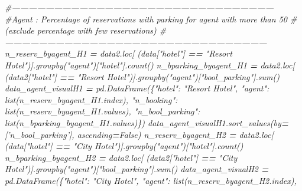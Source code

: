 \documentclass[10pt,a4paper]{article}
\newenvironment{Shaded}{\begin{snugshade}}{\end{snugshade}}
\newcommand{\BuiltInTok}[1]{#1}
\newcommand{\CommentTok}[1]{\textcolor[rgb]{0.56,0.35,0.01}{\textit{#1}}}
\newcommand{\NormalTok}[1]{#1}
\newcommand{\OperatorTok}[1]{\textcolor[rgb]{0.81,0.36,0.00}{\textbf{#1}}}
\newcommand{\StringTok}[1]{\textcolor[rgb]{0.31,0.60,0.02}{#1}}
\newcommand{\VariableTok}[1]{\textcolor[rgb]{0.00,0.00,0.00}{#1}}
\theoremstyle{break}
\begin{document}
\begin{Shaded}
\begin{Highlighting}[]
\CommentTok{#---------------------------------------------------------------------------------------------}
\CommentTok{#Agent : Percentage of reservations with parking for agent with more than 50%
\CommentTok{#        (exclude percentage with few reservations)}
\CommentTok{#---------------------------------------------------------------------------------------------}
\NormalTok{n_reserv_byagent_H1 }\OperatorTok{=}\NormalTok{ data2.loc[}
\NormalTok{    (data[}\StringTok{"hotel"}\NormalTok{] }\OperatorTok{==} \StringTok{"Resort Hotel"}\NormalTok{)].groupby(}\StringTok{"agent"}\NormalTok{)[}\StringTok{"hotel"}\NormalTok{].count()}
\NormalTok{n_bparking_byagent_H1 }\OperatorTok{=}\NormalTok{ data2.loc[}
\NormalTok{    (data2[}\StringTok{"hotel"}\NormalTok{] }\OperatorTok{==} \StringTok{"Resort Hotel"}\NormalTok{)].groupby(}\StringTok{"agent"}\NormalTok{)[}\StringTok{"bool_parking"}\NormalTok{].}\BuiltInTok{sum}\NormalTok{()}
\NormalTok{data_agent_visualH1 }\OperatorTok{=}\NormalTok{ pd.DataFrame(\{}\StringTok{"hotel"}\NormalTok{: }\StringTok{"Resort Hotel"}\NormalTok{,}
                                \StringTok{"agent"}\NormalTok{: }\BuiltInTok{list}\NormalTok{(n_reserv_byagent_H1.index),}
                                \StringTok{"n_booking"}\NormalTok{: }\BuiltInTok{list}\NormalTok{(n_reserv_byagent_H1.values),}
                                \StringTok{"n_bool_parking"}\NormalTok{: }\BuiltInTok{list}\NormalTok{(n_bparking_byagent_H1.values)\})}
\NormalTok{data_agent_visualH1.sort_values(by}\OperatorTok{=}\NormalTok{[}\StringTok{'n_bool_parking'}\NormalTok{], ascending}\OperatorTok{=}\VariableTok{False}\NormalTok{)}
\NormalTok{n_reserv_byagent_H2 }\OperatorTok{=}\NormalTok{ data2.loc[}
\NormalTok{    (data[}\StringTok{"hotel"}\NormalTok{] }\OperatorTok{==} \StringTok{"City Hotel"}\NormalTok{)].groupby(}\StringTok{"agent"}\NormalTok{)[}\StringTok{"hotel"}\NormalTok{].count()}
\NormalTok{n_bparking_byagent_H2 }\OperatorTok{=}\NormalTok{ data2.loc[}
\NormalTok{    (data2[}\StringTok{"hotel"}\NormalTok{] }\OperatorTok{==} \StringTok{"City Hotel"}\NormalTok{)].groupby(}\StringTok{"agent"}\NormalTok{)[}\StringTok{"bool_parking"}\NormalTok{].}\BuiltInTok{sum}\NormalTok{()}
\NormalTok{data_agent_visualH2 }\OperatorTok{=}\NormalTok{ pd.DataFrame(\{}\StringTok{"hotel"}\NormalTok{: }\StringTok{"City Hotel"}\NormalTok{,}
                                \StringTok{"agent"}\NormalTok{: }\BuiltInTok{list}\NormalTok{(n_reserv_byagent_H2.index),}
}
\end{Highlighting}
\end{Shaded}
\end{document}
